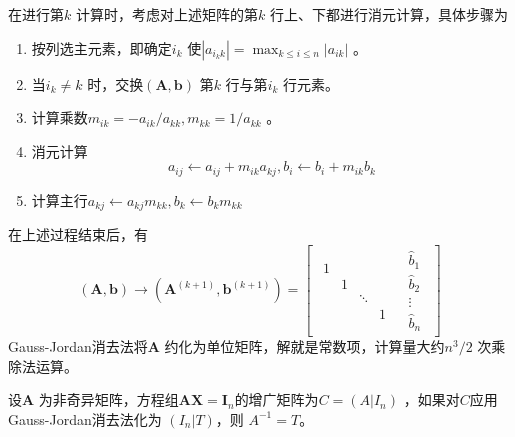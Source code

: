 \documentclass[a4paper]{article}
\begin{document}
在进行第$k$ 计算时，考虑对上述矩阵的第$k$ 行上、下都进行消元计算，具体步骤为
\begin{enumerate}
	\item 按列选主元素，即确定$i_k$ 使$|a_{i_k k}| = \max_{k \le i \le n} |a_{ik}|$ 。
	\item 当$i_k \neq k$ 时，交换$(\mathbf{A}, \mathbf{b})$ 第$k$ 行与第$i_k$ 行元素。
	\item 计算乘数$m_{ik} = - a_{ik} / a_{kk}, m_{kk} = 1 / a_{kk}$ 。
	\item 消元计算
		\[
			a_{ij} \gets a_{ij} + m_{ik} a_{kj}, b_i \gets b_i + m_{ik} b_k
		\] 
	\item 计算主行$a_{kj} \gets a_{kj} m_{kk}, b_k \gets b_k m_{kk}$
\end{enumerate}
在上述过程结束后，有
\[
	(\mathbf{A}, \mathbf{b}) \to (\mathbf{A}^{(k+1)}, \mathbf{b}^{(k+1)}) =
	\left[ 
	\begin{array}{c|c}
	\begin{matrix} 
		1 & & & \\
		  & 1 & & \\
		  & & \ddots & \\
		  & & & 1 
	\end{matrix} & 
	\begin{matrix} \hat{b}_1 \\ \hat{b}_2 \\ \vdots \\ \hat{b}_n \end{matrix} 
	\end{array}
	\right] 
\] 
Gauss-Jordan消去法将$\mathbf{A}$ 约化为单位矩阵，解就是常数项，计算量大约$n^3 / 2$ 次乘除法运算。

\begin{theorem}
	设$\mathbf{A}$ 为非奇异矩阵，方程组$\mathbf{AX} = \mathbf{I}_n$的增广矩阵为$C = (A | I_n)$ ，如果对$C$应用Gauss-Jordan消去法化为 $(I_n | T)$，则 $A^{-1} = T$。
\end{theorem}
\end{document}
